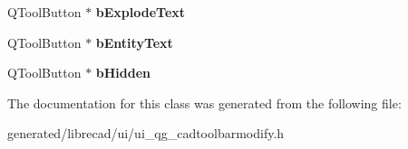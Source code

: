 \begin{DoxyCompactItemize}
\item 
\hypertarget{classUi__QG__CadToolBarModify_ad4e0efd02754ad0496982810235d6951}{Q\-Tool\-Button $\ast$ {\bfseries b\-Explode\-Text}}\label{classUi__QG__CadToolBarModify_ad4e0efd02754ad0496982810235d6951}

\item 
\hypertarget{classUi__QG__CadToolBarModify_a03883a11c560dd7d2f4ffdcd531dd918}{Q\-Tool\-Button $\ast$ {\bfseries b\-Entity\-Text}}\label{classUi__QG__CadToolBarModify_a03883a11c560dd7d2f4ffdcd531dd918}

\item 
\hypertarget{classUi__QG__CadToolBarModify_a8b4d3a6d7445087012b038e9f1581691}{Q\-Tool\-Button $\ast$ {\bfseries b\-Hidden}}\label{classUi__QG__CadToolBarModify_a8b4d3a6d7445087012b038e9f1581691}

\end{DoxyCompactItemize}


The documentation for this class was generated from the following file\-:\begin{DoxyCompactItemize}
\item 
generated/librecad/ui/ui\-\_\-qg\-\_\-cadtoolbarmodify.\-h\end{DoxyCompactItemize}
